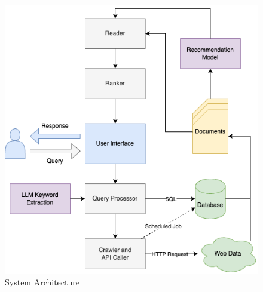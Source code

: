 \documentclass[journal]{IEEEtran}
\begin{document}
\begin{figure}
    \centering
    \includegraphics[width=1.0\linewidth]{doc//proposal//assets/sysarch.drawio.png}
    \caption{System Architecture}
    \label{fig:sysarch}
\end{figure}
\end{document}
